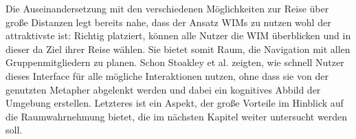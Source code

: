 Die Auseinandersetzung mit den verschiedenen Möglichkeiten zur Reise über große Distanzen legt bereits nahe, dass der Ansatz WIMs zu nutzen wohl der attraktivste ist:
Richtig platziert, können alle Nutzer die WIM überblicken und in dieser da Ziel ihrer Reise wählen. Sie bietet somit Raum, die Navigation mit allen Gruppenmitgliedern zu planen. Schon Stoakley et al. zeigten, wie schnell Nutzer dieses Interface für alle mögliche Interaktionen nutzen, ohne dass sie von der genutzten Metapher abgelenkt werden und dabei ein kognitives Abbild der Umgebung erstellen. 
Letzteres ist ein Aspekt, der große Vorteile im Hinblick auf die Raumwahrnehmung bietet, die im nächsten Kapitel weiter untersucht werden soll.
